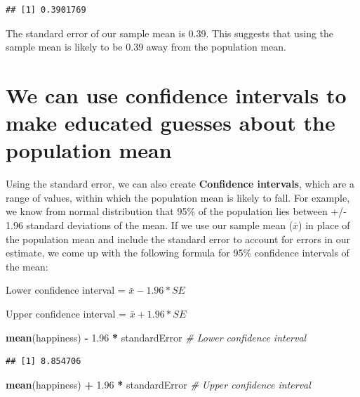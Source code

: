 \documentclass[
]{book}
\newenvironment{Shaded}{\begin{snugshade}}{\end{snugshade}}
\newcommand{\CommentTok}[1]{\textcolor[rgb]{0.56,0.35,0.01}{\textit{#1}}}
\newcommand{\FloatTok}[1]{\textcolor[rgb]{0.00,0.00,0.81}{#1}}
\newcommand{\KeywordTok}[1]{\textcolor[rgb]{0.13,0.29,0.53}{\textbf{#1}}}
\newcommand{\NormalTok}[1]{#1}
\newcommand{\OperatorTok}[1]{\textcolor[rgb]{0.81,0.36,0.00}{\textbf{#1}}}
\newcommand{\StringTok}[1]{\textcolor[rgb]{0.31,0.60,0.02}{#1}}
\begin{document}
\begin{verbatim}
## [1] 0.3901769
\end{verbatim}

The standard error of our sample mean is 0.39. This suggests that using the sample mean is likely to be 0.39 away from the population mean.

\hypertarget{we-can-use-confidence-intervals-to-make-educated-guesses-about-the-population-mean}{%
\section{We can use confidence intervals to make educated guesses about the population mean}\label{we-can-use-confidence-intervals-to-make-educated-guesses-about-the-population-mean}}

Using the standard error, we can also create \textbf{Confidence intervals}, which are a range of values, within which the population mean is likely to fall. For example, we know from normal distribution that 95\% of the population lies between +/- 1.96 standard deviations of the mean. If we use our sample mean (\(\bar{x}\)) in place of the population mean and include the standard error to account for errors in our estimate, we come up with the following formula for 95\% confidence intervals of the mean:

Lower confidence interval = \(\bar{x} - 1.96*SE\)

Upper confidence interval = \(\bar{x} + 1.96*SE\)

\begin{Shaded}
\begin{Highlighting}[]
\KeywordTok{mean}\NormalTok{(happiness) }\OperatorTok{-}\StringTok{ }\FloatTok{1.96} \OperatorTok{*}\StringTok{ }\NormalTok{standardError }\CommentTok{# Lower confidence interval}
\end{Highlighting}
\end{Shaded}

\begin{verbatim}
## [1] 8.854706
\end{verbatim}

\begin{Shaded}
\begin{Highlighting}[]
\KeywordTok{mean}\NormalTok{(happiness) }\OperatorTok{+}\StringTok{ }\FloatTok{1.96} \OperatorTok{*}\StringTok{ }\NormalTok{standardError }\CommentTok{# Upper confidence interval}
\end{Highlighting}
\end{Shaded}
\end{document}

